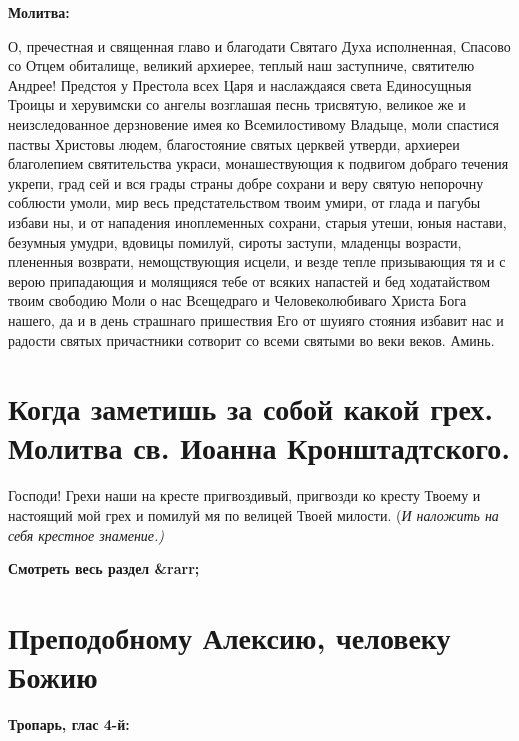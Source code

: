 \bfseries Молитва:\normalfont{}


О, пречестная и священная главо и благодати Святаго Духа исполненная, Спасово со Отцем обиталище, великий архиерее, теплый наш заступниче, святителю Андрее! Предстоя у Престола всех Царя и наслаждаяся света Единосущныя Троицы и херувимски со ангелы возглашая песнь трисвятую, великое же и неизследованное дерзновение имея ко Всемилостивому Владыце, моли спастися паствы Христовы людем, благостояние святых церквей утверди, архиереи благолепием святительства украси, монашествующия к подвигом добраго течения укрепи, град сей и вся грады страны добре сохрани и веру святую непорочну соблюсти умоли, мир весь предстательством твоим умири, от глада и пагубы избави ны, и от нападения иноплеменных сохрани, старыя утеши, юныя настави, безумныя умудри, вдовицы помилуй, сироты заступи, младенцы возрасти, плененныя возврати, немощствующия исцели, и везде тепле призывающия тя и с верою припадающия и молящияся тебе от всяких напастей и бед ходатайством твоим свободию Моли о нас Всещедраго и Человеколюбиваго Христа Бога нашего, да и в день страшнаго пришествия Его от шуияго стояния избавит нас и радости святых причастники сотворит со всеми святыми во веки веков. Аминь.


\section{Когда заметишь за собой какой грех. Молитва св. Иоанна Кронштадтского.}
 


Господи! Грехи наши на кресте пригвоздивый, пригвозди ко кресту Твоему и настоящий мой грех и помилуй мя по велицей Твоей милости. (\itshape И наложить на себя крестное знамение.\normalfont{})


\mychapterending


\bfseries Смотреть весь раздел &rarr;\normalfont{} 

\section{Преподобному Алексию, человеку Божию}
 


\bfseries Тропарь, глас 4-й:\normalfont{}


